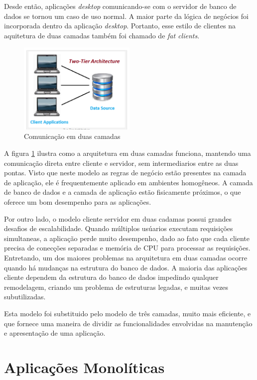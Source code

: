 Desde então, aplicações \textit{desktop} comunicando-se com o servidor de banco de dados se tornou um caso de uso normal. A maior parte da lógica de negócios foi incorporada dentro da aplicação \textit{desktop}. Portanto, esse estilo de clientes na aquitetura de duas camadas também foi chamado de \textit{fat clients}.

\begin{figure}[htbp]
    \centering
    \includegraphics[width=0.5\textwidth]{figuras/two-tier.png}
    \caption{Comunicação em duas camadas}
    \label{fig:two-tier}
\end{figure}

A figura \ref{fig:two-tier} ilustra como a arquitetura em duas camadas funciona, mantendo uma comunicação direta entre cliente e servidor, sem intermediarios entre as duas pontas. Visto que neste modelo as regras de negócio estão presentes na camada de aplicação, ele é frequentemente aplicado em ambientes homogêneos. A camada de banco de dados e a camada de aplicação estão fisicamente próximos, o que oferece um bom desempenho para as aplicações.

Por outro lado, o modelo cliente servidor em duas cadamas possui grandes desafios de escalabilidade. Quando múltiplos usúarios executam requisições simultaneas, a aplicação perde muito desempenho, dado ao fato que cada cliente precisa de conecções separadas e memória de CPU para processar as requisições. Entretando, um dos maiores problemas na arquitetura em duas camadas ocorre quando há mudanças na estrutura do banco de dados. A maioria das aplicações cliente dependem da estrutura do banco de dados impedindo qualquer remodelagem, criando um problema de estruturas legadas, e muitas vezes subutilizadas.

Esta modelo foi substituido pelo modelo de três camadas, muito mais eficiente, e que fornece uma maneira de dividir as funcionalidades envolvidas na manutenção e apresentação de uma aplicação.

\section{Aplicações Monolíticas}\label{sec:monolitico}


